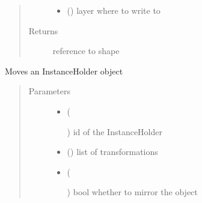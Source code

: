 \documentclass[a4paper,10pt,english]{sphinxmanual}
\begin{document}
\begin{fulllineitems}
\begin{fulllineitems}
\begin{quote}
\begin{description}
\begin{itemize}
\item {} 
 () \textendash{} layer where to write to

\end{itemize}

\item[{Returns}] \leavevmode
reference to shape

\end{description}\end{quote}

\end{fulllineitems}


\begin{fulllineitems}
\label{\detokenize{photonics/photonics:kppc.photonics.PhotDevice.move_instance}}
Moves an InstanceHolder object
\begin{quote}\begin{description}
\item[{Parameters}] \leavevmode\begin{itemize}
\item {} 
 (%
\begin{footnote}[70]\sphinxAtStartFootnote
{}
%
\end{footnote}) \textendash{} id of the InstanceHolder

\item {} 
 () \textendash{} list of transformations

\item {} 
 (%
\begin{footnote}[71]\sphinxAtStartFootnote
{}
%
\end{footnote}) \textendash{} bool whether to mirror the object


\end{itemize}
\end{description}
\end{quote}
\end{fulllineitems}
\end{fulllineitems}
\end{document}
